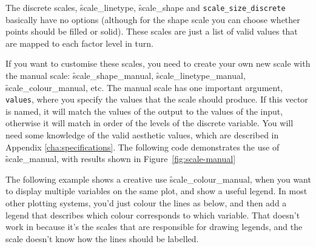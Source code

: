 The discrete scales, \f{scale_linetype}, \f{scale_shape} and {\tt scale\-\_size\-\_discrete} basically have no options (although for the shape scale you can choose whether points should be filled or solid). These scales are just a list of valid values that are mapped to each factor level in turn.   

If you want to customise these scales, you need to create your own new scale with the manual scale: \f{scale_shape_manual}, \f{scale_linetype_manual}, \f{scale_colour_manual}, etc. The manual scale has one important argument, \verb|values|, where you specify the values that the scale should produce. If this vector is named, it will match the values of the output to the values of the input, otherwise it will match in order of the levels of the discrete variable. You will need some knowledge of the valid aesthetic values, which are described in Appendix \ref{cha:specifications}.  The following code demonstrates the use of \f{scale_manual}, with results shown in Figure~\ref{fig:scale-manual}   

% 


The following example shows a creative use \f{scale_colour_manual}, when you want to display multiple variables on the same plot, and show a useful legend. In most other plotting systems, you'd just colour the lines as below, and then add a legend that describes which colour corresponds to which variable.  That doesn't work in \ggplot because it's the scales that are responsible for drawing legends, and the scale doesn't know how the lines should be labelled.

% 


